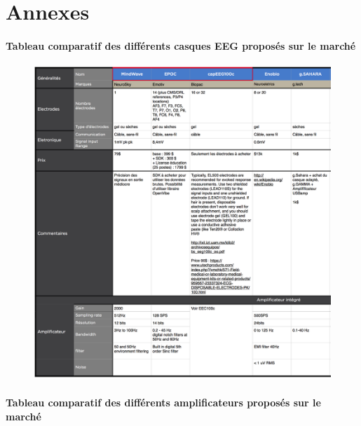 \part*{Annexes}




\subsection* {Tableau comparatif des différents casques EEG proposés sur le marché}

\begin{figure}[h]
	\centering\includegraphics[width=17cm, angle=0]{images/ComparaisonCasques.jpg}
\end{figure}




\newpage
\subsection* {Tableau comparatif des différents amplificateurs proposés sur le marché}

